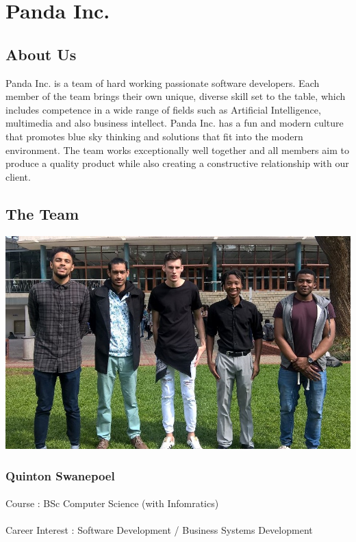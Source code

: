 \documentclass[11pt]{article}
\begin{document}
\newpage
\tableofcontents
\newpage

\section{Panda Inc.}
\subsection{About Us}
Panda Inc. is a team of hard working passionate software developers. Each member of the team brings their own unique, diverse skill set to the table, which includes competence in a wide range of fields such as Artificial Intelligence, multimedia and also business intellect. Panda Inc. has a fun and modern culture that promotes blue sky thinking and solutions that fit into the modern environment. The team works exceptionally well together and all members aim to produce a quality product while also creating a constructive relationship with our client.


\subsection{The Team}
\includegraphics[width=\textwidth]{Images/Team_Pic.jpg}

\subsubsection{Quinton Swanepoel} 
\paragraph{}Course : BSc Computer Science (with Infomratics)
\paragraph{}Career Interest : Software Development / Business Systems Development  
\end{document}
